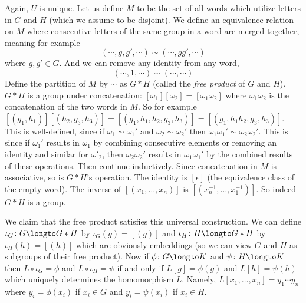 \medskip
\centerline{\def\diagcolwidth{1cm}\def\diagrowheight{.75cm}}

Again, $U$ is unique.
Let us define $M$ to be the set of all words which utilize letters in $G$ and $H$ (which we assume to be disjoint).
We define an equivalence relation on $M$ where consecutive letters of the same group in a word are merged together, meaning for example
$$ (\cdots,g,g',\cdots) \sim (\cdots,gg',\cdots) $$
where $g,g'\in G$.
And we can remove any identity from any word,
$$ (\cdots,1,\cdots) \sim (\cdots,\cdots) $$
Define the partition of $M$ by $\sim$ as $G*H$ (called the {\it free product} of $G$ and $H$).
$G*H$ is a group under concatenation: $[\omega_1][\omega_2]=[\omega_1\omega_2]$ where $\omega_1\omega_2$ is the concatenation of the two words in $M$.
So for example $[(g_1,h_1)][(h_2,g_3,h_3)]=[(g_1,h_1,h_2,g_3,h_3)]=[(g_1,h_1h_2,g_3,h_3)]$.
This is well-defined, since if $\omega_1\sim\omega_1'$ and $\omega_2\sim\omega_2'$ then $\omega_1\omega_1'\sim\omega_2\omega_2'$.
This is since if $\omega_1'$ results in $\omega_1$ by combining consecutive elements or removing an identity and similar for $\omega'_2$, then $\omega_2\omega_2'$ results in $\omega_1\omega_1'$ by the
combined results of these operations.
Then continue inductively.
Since concatenation in $M$ is associative, so is $G*H$'s operation.
The identity is $[\epsilon]$ (the equivalence class of the empty word).
The inverse of $[(x_1,\dots,x_n)]$ is $[(x_n^{-1},\dots,x_1^{-1})]$.
So indeed $G*H$ is a group.

We claim that the free product satisfies this universal construction.
We can define $\iota_G\colon G\longto G*H$ by $\iota_G(g)=[(g)]$ and $\iota_H\colon H\longto G*H$ by $\iota_H(h)=[(h)]$ which are obviously embeddings (so we can view $G$ and $H$ as subgroups of their free
product).
Now if $\phi\colon G\longto K$ and $\psi\colon H\longto K$ then $L\circ\iota_G=\phi$ and $L\circ\iota_H=\psi$ if and only if $L[g]=\phi(g)$ and $L[h]=\psi(h)$ which uniquely determines the homomorphism $L$.
Namely, $L[x_1,\dots,x_n]=y_1\cdots y_n$ where $y_i=\phi(x_i)$ if $x_i\in G$ and $y_i=\psi(x_i)$ if $x_i\in H$.

